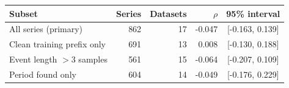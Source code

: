 \begin{tabular}{lrrrc}
\toprule
Subset & Series & Datasets & $\rho$ & 95\% interval \\
\midrule
All series (primary) & 862 & 17 & -0.047 & [-0.163, 0.139] \\
Clean training prefix only & 691 & 13 & 0.008 & [-0.130, 0.188] \\
Event length $>3$ samples & 561 & 15 & -0.064 & [-0.207, 0.109] \\
Period found only & 604 & 14 & -0.049 & [-0.176, 0.229] \\
\bottomrule
\end{tabular}
